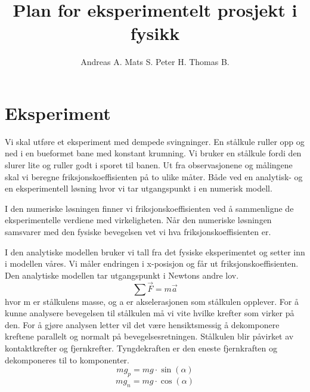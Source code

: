 \documentclass[5p,sort&compress]{elsarticle}
\begin{document}
\begin{frontmatter}

\title{Plan for eksperimentelt prosjekt i fysikk}

\author{Andreas A. Mats S. Peter H. Thomas B.}

\end{frontmatter}


\section{Eksperiment}
Vi skal utføre et eksperiment med dempede svingninger. En stålkule ruller opp og ned i en bueformet bane med konstant krumning. Vi bruker en stålkule fordi den slurer lite og ruller godt i sporet til banen. Ut fra observasjonene og målingene skal vi beregne friksjonskoeffisienten på to ulike måter. Både ved en analytisk- og en eksperimentell løsning hvor vi tar utgangspunkt i en numerisk modell.

I den numeriske løsningen finner vi friksjonskoeffisienten ved å sammenligne de eksperimentelle verdiene med virkeligheten. Når den numeriske løsningen samsvarer med den fysiske bevegelsen vet vi hva friksjonskoeffisienten er.

I den analytiske modellen bruker vi tall fra det fysiske eksperimentet og setter inn i modellen våres. Vi måler endringen i x-posisjon og får ut friksjonskoeffisienten.
Den analytiske modellen tar utgangspunkt i Newtons andre lov.
\begin{equation}
\sum{\vec{F}} = m\vec{a}
\label{eq:Newtons Andre Lov} 
\end{equation}
hvor m er stålkulens masse, og a er akselerasjonen som stålkulen opplever. For å kunne analysere bevegelsen til stålkulen må vi vite hvilke krefter som virker på den. For å gjøre analysen letter vil det være hensiktsmessig å dekomponere kreftene parallelt og normalt på bevegelsesretningen. Stålkulen blir påvirket av kontaktkrefter og fjernkrefter. Tyngdekraften er den eneste fjernkraften og dekomponeres til to komponenter.
\begin{equation}
mg_{p} = mg\cdot\sin(\alpha)
\end{equation}
\begin{equation}
mg_{n} = mg\cdot\cos(\alpha)
\end{equation}
\end{document}
